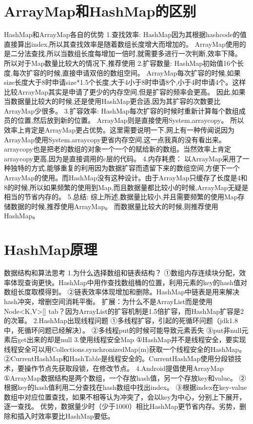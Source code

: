 \documentclass[9pt, b5paper]{article}
\begin{document}
\section{ArrayMap和HashMap的区别}
\label{sec-9}
HashMap和ArrayMap各自的优势
1.查找效率:
HashMap因为其根据hashcode的值直接算出index,所以其查找效率是随着数组长度增大而增加的。
ArrayMap使用的是二分法查找,所以当数组长度每增加一倍时,就需要多进行一次判断,效率下降。
所以对于Map数量比较大的情况下,推荐使用
2.扩容数量:
HashMap初始值16个长度,每次扩容的时候,直接申请双倍的数组空间。
ArrayMap每次扩容的时候,如果size长度大于8时申请size*1.5个长度,大于4小于8时申请8个,小于4时申请4个。这样比较ArrayMap其实是申请了更少的内存空间,但是扩容的频率会更高。
因此,如果当数据量比较大的时候,还是使用HashMap更合适,因为其扩容的次数要比ArrayMap少很多。
3.扩容效率:
HashMap每次扩容的时候时重新计算每个数组成员的位置,然后放到新的位置。
ArrayMap则是直接使用System.arraycopy。
所以效率上肯定是ArrayMap更占优势。这里需要说明一下,网上有一种传闻说因为ArrayMap使用System.arraycopy更省内存空间,这一点我真的没有看出来。arraycopy也是把老的数组的对象一个一个的赋给新的数组。当然效率上肯定arraycopy更高,因为是直接调用的c层的代码。
4.内存耗费：
以ArrayMap采用了一种独特的方式,能够重复的利用因为数据扩容而遗留下来的数组空间,方便下一个ArrayMap的使用。而HashMap没有这种设计。由于ArrayMap只缓存了长度是4和8的时候,所以如果频繁的使用到Map,而且数据量都比较小的时候,ArrayMap无疑是相当的节省内存的。
5.总结:
综上所述,数据量比较小,并且需要频繁的使用Map存储数据的时候,推荐使用ArrayMap。
而数据量比较大的时候,则推荐使用HashMap。

\section{HashMap原理}
\label{sec-10}
数据结构和算法思考
1.为什么选择数组和链表结构？
①数组内存连续块分配，效率体现查询更快。HashMap中用作查找数组桶的位置，利用元素的key的hash值对数组长度取模得到。
②链表效率体现增加和删除。HashMap中链表是用来解决hash冲突，增删空间消耗平衡。
扩展：为什么不是ArrayList而是使用Node<K,V>[] tab？因为ArrayList的扩容机制是1.5倍扩容，而HashMap扩容是2的次幂。
2.HashMap出现线程问题
①多线程扩容，引起的死循环问题（jdk1.8中，死循环问题已经解决）。
②多线程put的时候可能导致元素丢失
③put非null元素后get出来的却是null
3.使用线程安全Map
①HashMap并不是线程安全，要实现线程安全可以用Collections.synchronizedMap(m)获取一个线程安全的HashMap。
②CurrentHashMap和HashTable是线程安全的。CurrentHashMap使用分段锁技术，要操作节点先获取段锁，在修改节点。
4.Android提倡使用ArrayMap
①ArrayMap数据结构是两个数组，一个存放hash值，另一个存放key和value。
②根据key的hash值利用二分查找在hash数组中找出index。
③根据index在key-value数组中对应位置查找，如果不相等认为冲突了，会以key为中心，分别上下展开，逐一查找。
优势，数据量少时（少于1000）相比HashMap更节省内存。劣势，删除和插入时效率要比HashMap要低。
\end{document}
